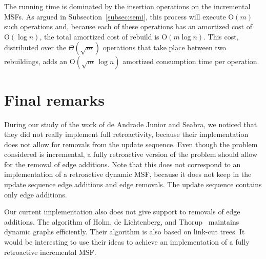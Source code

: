 \documentclass[reqno,11pt]{amsart}
\newcommand{\Oh}{\mathrm{O}}
\begin{document}
The running time is dominated by the insertion operations 
on the incremental MSFs.  As argued in Subsection~\ref{subsec:semi}, 
this process will execute $\Oh(m)$ such operations and, 
because each of these operations has an amortized cost of $\Oh(\log{n})$,
the total amortized cost of {\sc rebuild} is $\Oh(m \log{n})$.  This cost, distributed 
over the $\Theta(\sqrt{m})$ operations that take place between two rebuildings,
adds an $\Oh(\sqrt{m}\,\log{n})$ amortized consumption time per operation.

\section{Final remarks}\label{sec:final}


During our study of the work of de Andrade Junior and Seabra, we noticed that
they did not really implement full retroactivity, because their implementation
does not allow for removals from the update sequence.  Even though the problem
considered is incremental, a fully retroactive version of the problem should
allow for the removal of edge additions.  Note that this does not correspond
to an implementation of a retroactive dynamic MSF, because it does not keep
in the update sequence edge additions and edge removals.  The update sequence
contains only edge additions.

Our current implementation also does not give support to removals of edge additions.
The algorithm of Holm, de Lichtenberg, and Thorup~\cite{HolmLT2001} maintains
dynamic graphs efficiently.  Their algorithm is also based on link-cut trees.
It would be interesting to use their ideas to achieve an implementation of
a fully retroactive incremental MSF.





\end{document}
